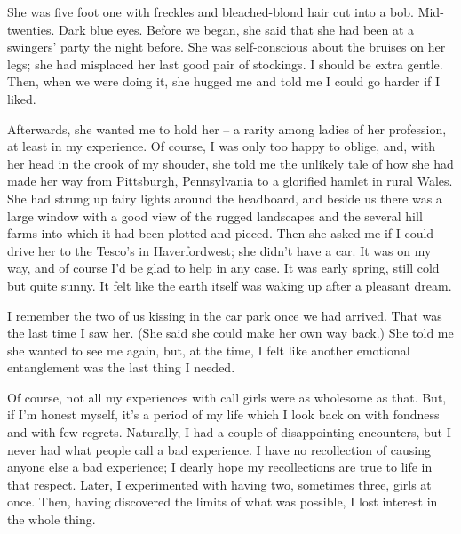 She was five foot one with freckles and bleached-blond hair cut into a bob. Mid-twenties. Dark blue eyes. Before we began, she said that she had been at a swingers' party the night before. She was self-conscious about the bruises on her legs; she had misplaced her last good pair of stockings. I should be extra gentle. Then, when we were doing it, she hugged me and told me I could go harder if I liked.

Afterwards, she wanted me to hold her -- a rarity among ladies of her profession, at least in my experience. Of course, I was only too happy to oblige, and, with her head in the crook of my shouder, she told me the unlikely tale of how she had made her way from Pittsburgh, Pennsylvania to a glorified hamlet in rural Wales. She had strung up fairy lights around the headboard, and beside us there was a large window with a good view of the rugged landscapes and the several hill farms into which it had been plotted and pieced. Then she asked me if I could drive her to the Tesco's in Haverfordwest; she didn't have a car. It was on my way, and of course I'd be glad to help in any case. It was early spring, still cold but quite sunny. It felt like the earth itself was waking up after a pleasant dream.

I remember the two of us kissing in the car park once we had arrived. That was the last time I saw her. (She said she could make her own way back.) She told me she wanted to see me again, but, at the time, I felt like another emotional entanglement was the last thing I needed.

Of course, not all my experiences with call girls were as wholesome as that. But, if I'm honest myself, it's a period of my life which I look back on with fondness and with few regrets. Naturally, I had a couple of disappointing encounters, but I never had what people call a bad experience. I have no recollection of causing anyone else a bad experience; I dearly hope my recollections are true to life in that respect. Later, I experimented with having two, sometimes three, girls at once. Then, having discovered the limits of what was possible, I lost interest in the whole thing.

\section{}

